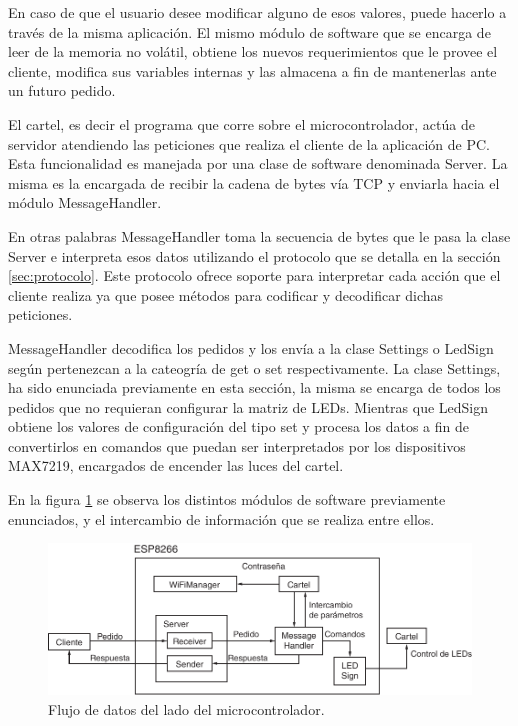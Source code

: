 En caso de que el usuario desee modificar alguno de esos valores, puede hacerlo a través de la misma aplicación.
El mismo módulo de software que se encarga de leer de la memoria no volátil, obtiene los nuevos requerimientos que le provee el cliente, modifica sus variables internas y las almacena a fin de mantenerlas ante un futuro pedido.

El cartel, es decir el programa que corre sobre el microcontrolador, actúa de servidor atendiendo las peticiones que realiza el cliente de la aplicación de PC.
Esta funcionalidad es manejada por una clase de software denominada Server.
La misma es la encargada de recibir la cadena de bytes vía TCP y enviarla hacia el módulo MessageHandler.

En otras palabras MessageHandler toma la secuencia de bytes que le pasa la clase Server e interpreta esos datos utilizando el protocolo que se detalla en la sección \ref{sec:protocolo}.
Este protocolo ofrece soporte para interpretar cada acción que el cliente realiza ya que posee métodos para codificar y decodificar dichas peticiones.

MessageHandler decodifica los pedidos y los envía a la clase Settings o LedSign según pertenezcan a la cateogría de get o set respectivamente.
La clase Settings, ha sido enunciada previamente en esta sección, la misma se encarga de todos los pedidos que no requieran configurar la matriz de LEDs.
Mientras que LedSign obtiene los valores de configuración del tipo set y procesa los datos a fin de convertirlos en comandos que puedan ser interpretados por los dispositivos MAX7219, encargados de encender las luces del cartel.

En la figura \ref{fig:flujo_de_datos} se observa los distintos módulos de software previamente enunciados, y el intercambio de información que se realiza entre ellos.


\begin{figure}[!ht]
	\centering
	\includegraphics[width=1\linewidth]{imagenes/diagrama-bloque.pdf}
	\caption{Flujo de datos del lado del microcontrolador.}
	\label{fig:flujo_de_datos}
\end{figure}

